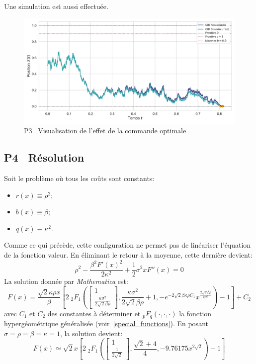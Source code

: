 \FloatBarrier Une simulation est aussi effectuée. 
\begin{figure}[htb]
    \centering
    \includegraphics[width=0.9\linewidth]{img/validation/P3/p3_control_simulation.pdf}
    \caption{P3 \textemdash~Visualisation de l'effet de la commande optimale}\label{fig:Simulation3}
\end{figure}\FloatBarrier\subsection{P4 \textemdash~Résolution}
Soit le problème où tous les coûts sont constants:
\begin{itemize}
    \item $r(x)\equiv\rho^2$;
    \item $b(x)\equiv\beta$;
    \item $q(x)\equiv\kappa^2$.
\end{itemize}
Comme ce qui précède, cette configuration ne permet pas de linéariser l'équation de la fonction valeur. En éliminant le retour à la moyenne, cette dernière devient:
\[
\rho ^2-\frac{\beta ^2 {F'(x)}^2}{2 \kappa ^2}+\frac{1}{2} \sigma ^2 x F''(x)=0
\]
La solution donnée par \textit{Mathematica} est:
\[
    F(x)=\frac{\sqrt{2} \kappa  \rho  x }{\beta}\left[2 \; _2F_1\left(\begin{bmatrix}1\\\frac{\kappa  \sigma ^2}{2 \sqrt{2} \beta  \rho }\end{bmatrix},\frac{\kappa  \sigma ^2}{2 \sqrt{2} \beta  \rho }+1,-e^{-2 \sqrt{2} \beta  \kappa  \rho  C_1} x^{\frac{2 \sqrt{2} \beta  \rho }{\kappa  \sigma ^2}}\right)-1\right]+C_2
\]
avec $C_1$ et $C_2$ des constantes à déterminer et $_pF_q(\cdot,\cdot,\cdot)$ la fonction hypergéométrique généralisée (voir~\ref{special_functions}). En posant $\sigma=\rho=\beta=\kappa=1$, la solution devient:
\begin{equation}\label{sol_control_4}
    F(x)\simeq\sqrt{2} x \left[2 \; _2F_1\left(\begin{bmatrix}1\\\frac{1}{2 \sqrt{2}}\end{bmatrix},\frac{\sqrt{2}+4}{4} ,-9.76175 x^{2 \sqrt{2}}\right)-1\right]
\end{equation}
